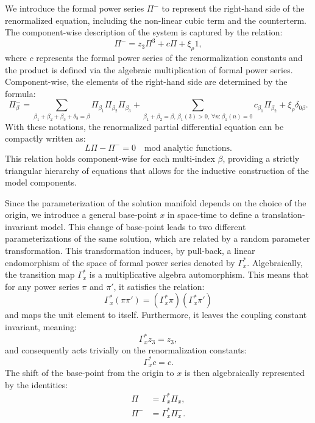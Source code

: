 We introduce the formal power series $\Pi^-$ to represent the right-hand side of the renormalized equation, including the non-linear cubic term and the counterterm. The component-wise description of the system is captured by the relation:
\begin{equation}
\Pi^- = z_3 \Pi^3 + c \Pi + \xi_\rho 1,
\end{equation}
where $c$ represents the formal power series of the renormalization constants and the product is defined via the algebraic multiplication of formal power series. Component-wise, the elements of the right-hand side are determined by the formula:
\begin{equation}
\Pi^-_\beta = \sum_{\beta_1 + \beta_2 + \beta_3 + \delta_3 = \beta} \Pi_{\beta_1} \Pi_{\beta_2} \Pi_{\beta_3} + \sum_{\beta_1 + \beta_2 = \beta, \, \beta_1(3) > 0, \, \forall n: \beta_1(n) = 0} c_{\beta_1} \Pi_{\beta_2} + \xi_\rho \delta_{0\beta}.
\end{equation}
With these notations, the renormalized partial differential equation can be compactly written as:
\begin{equation}
L\Pi - \Pi^- = 0 \quad \text{mod analytic functions}.
\end{equation}
This relation holds component-wise for each multi-index $\beta$, providing a strictly triangular hierarchy of equations that allows for the inductive construction of the model components.

Since the parameterization of the solution manifold depends on the choice of the origin, we introduce a general base-point $x$ in space-time to define a translation-invariant model. This change of base-point leads to two different parameterizations of the same solution, which are related by a random parameter transformation. This transformation induces, by pull-back, a linear endomorphism of the space of formal power series denoted by $\Gamma^*_x$. Algebraically, the transition map $\Gamma^*_x$ is a multiplicative algebra automorphism. This means that for any power series $\pi$ and $\pi'$, it satisfies the relation:
\begin{equation}
\Gamma^*_x(\pi \pi') = (\Gamma^*_x \pi) (\Gamma^*_x \pi')
\end{equation}
and maps the unit element to itself. Furthermore, it leaves the coupling constant invariant, meaning:
\begin{equation}
\Gamma^*_x z_3 = z_3,
\end{equation}
and consequently acts trivially on the renormalization constants:
\begin{equation}
\Gamma^*_x c = c.
\end{equation}
The shift of the base-point from the origin to $x$ is then algebraically represented by the identities:
\begin{align}
\Pi &= \Gamma^*_x \Pi_x, \\
\Pi^- &= \Gamma^*_x \Pi^-_x.
\end{align}


